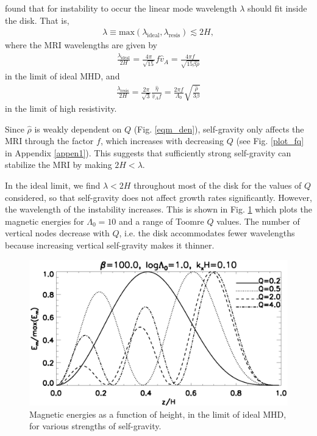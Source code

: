 \cite{sano99} found that for instability to occur the linear mode
wavelength $\lambda$ should fit inside the disk. That is,   
\begin{align}\label{sano_crit}
  \lambda \equiv
  \mathrm{max}\left(\lambda_\mathrm{ideal},\lambda_\mathrm{resis}\right)\lesssim
  2H, 
\end{align}
where the MRI wavelengths are given by 
\begin{align}\label{lambda_ideal}
  \frac{\lambda_\mathrm{ideal}}{2H} = \frac{4\pi}{\sqrt{15}} f \hat{v}_A =
  \frac{4\pi f}{\sqrt{15\beta\hat{\rho}}}
\end{align}
in the limit of ideal MHD, and 
\begin{align}\label{lambda_resis}
  \frac{\lambda_\mathrm{resis}}{2H} = \frac{2\pi}{\sqrt{3}}\frac{\hat{\eta}}{\hat{v}_A f} =
  \frac{2\pi f}{\Lambda_0}\sqrt{\frac{\hat{\rho}}{3\beta}} 
\end{align}
in the limit of high resistivity.  
   
Since $\hat{\rho}$ is weakly dependent
on $Q$ (Fig. \ref{eqm_den}), self-gravity only affects the
MRI through the factor $f$, which increases with decreasing $Q$ (see
Fig. \ref{plot_fq} in Appendix \ref{appen1}). This suggests that
sufficiently strong self-gravity can stabilize the MRI by making
$ 2H<\lambda $. 
 
In the ideal limit, we find $\lambda < 2H$ throughout most of the disk
for the values of $Q$ considered, so that self-gravity does not affect
growth rates significantly. However, the wavelength of the instability
increases. This is shown in Fig. \ref{compare_result_lambda10} which
plots the magnetic energies for $\Lambda_0=10$ and a range of Toomre $Q$
values. The number of vertical nodes decrease with $Q$, 
i.e. the disk accommodates fewer wavelengths because increasing
vertical self-gravity makes it thinner. 


\begin{figure}
  \includegraphics[width=\linewidth]{figures/compare_result_lambda10}
  \caption{Magnetic energies as a function of height, in the limit of
    ideal MHD, for various strengths of self-gravity.   
    \label{compare_result_lambda10}}
\end{figure}

